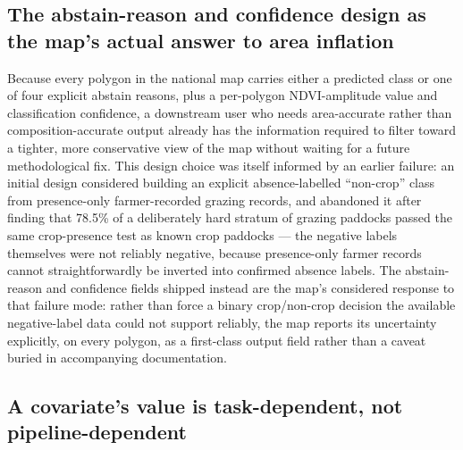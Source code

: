 \subsection{The abstain-reason and confidence design as the map's actual answer to area inflation}\label{the-abstain-reason-and-confidence-design-as-the-maps-actual-answer-to-area-inflation}

Because every polygon in the national map carries either a predicted class or one of four explicit abstain reasons, plus a per-polygon NDVI-amplitude value and classification confidence, a downstream user who needs area-accurate rather than composition-accurate output already has the information required to filter toward a tighter, more conservative view of the map without waiting for a future methodological fix. This design choice was itself informed by an earlier failure: an initial design considered building an explicit absence-labelled ``non-crop'' class from presence-only farmer-recorded grazing records, and abandoned it after finding that 78.5\% of a deliberately hard stratum of grazing paddocks passed the same crop-presence test as known crop paddocks --- the negative labels themselves were not reliably negative, because presence-only farmer records cannot straightforwardly be inverted into confirmed absence labels. The abstain-reason and confidence fields shipped instead are the map's considered response to that failure mode: rather than force a binary crop/non-crop decision the available negative-label data could not support reliably, the map reports its uncertainty explicitly, on every polygon, as a first-class output field rather than a caveat buried in accompanying documentation.

\subsection{A covariate's value is task-dependent, not pipeline-dependent}\label{a-covariates-value-is-task-dependent-not-pipeline-dependent}

